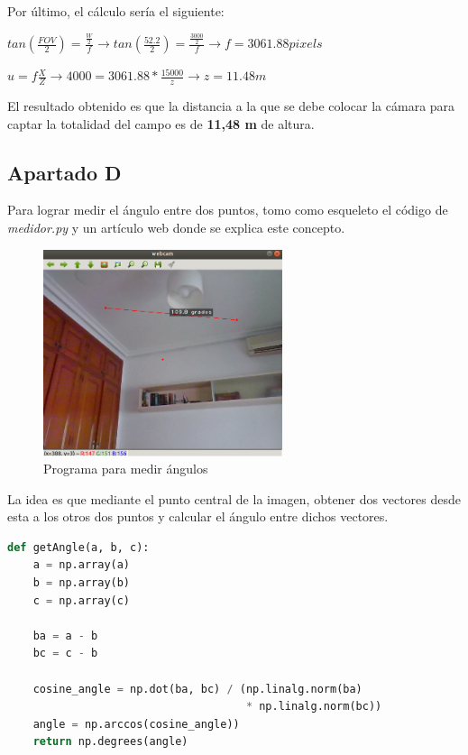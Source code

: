 \documentclass[a4paper]{article} %
\begin{document}
\newpage
Por último, el cálculo sería el siguiente:

\begin{center}
	$tan(\frac{FOV}{2}) = \frac{\frac{W}{2}}{\textit{f}} \rightarrow tan(\frac{52.2}{2}) = \frac{\frac{3000}{2}}{\textit{f}} \rightarrow \textit{f} = 3061.88 pixels$
\end{center}
\begin{center}
	$u = \textit{f} \frac{X}{Z} \rightarrow 4000 = 3061.88 * \frac{15000}{z} \rightarrow z = 11.48 m$
\end{center}

El resultado obtenido es que la distancia a la que se debe colocar la cámara para captar la totalidad del campo es de \textbf{11,48 m} de altura.

\subsection{Apartado D}

Para lograr medir el ángulo entre dos puntos, tomo como esqueleto el código de \textit{medidor.py} y un artículo web \cite{Angulos} donde se explica este concepto.

\begin{figure}[htp]
	\centering
	\includegraphics[width=7cm]{imagenes/angulo.png}
	\caption{Programa para medir ángulos}
	\label{fig:libreta}
\end{figure}

La idea es que mediante el punto central de la imagen, obtener dos vectores desde esta a los otros dos puntos y calcular el ángulo entre dichos vectores.\\

\begin{tcolorbox}[]
\begin{lstlisting}[language=Python]
def getAngle(a, b, c):
	a = np.array(a)
	b = np.array(b)
	c = np.array(c)
			
	ba = a - b
	bc = c - b
			
	cosine_angle = np.dot(ba, bc) / (np.linalg.norm(ba) 
	                                 * np.linalg.norm(bc))
	angle = np.arccos(cosine_angle))
	return np.degrees(angle)
\end{lstlisting}
\end{tcolorbox}
\end{document}

